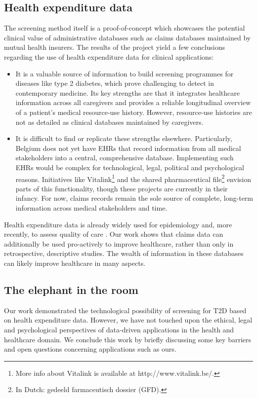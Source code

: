 \subsection{Health expenditure data}
The screening method itself is a proof-of-concept which showcases the potential clinical value of administrative databases such as claims databases maintained by mutual health insurers. The results of the project yield a few conclusions regarding the use of health expenditure data for clinical applications:

\begin{itemize}
\item It is a valuable source of information to build screening programmes for diseases like type 2 diabetes, which prove challenging to detect in contemporary medicine. Its key strengths are that it integrates healthcare information across all caregivers and provides a reliable longitudinal overview of a patient's medical resource-use history. However, resource-use histories are not as detailed as clinical databases maintained by caregivers.
\item It is difficult to find or replicate these strengths elsewhere. Particularly, Belgium does not yet have EHRs that record information from all medical stakeholders into a central, comprehensive database. Implementing such EHRs would be complex for technological, legal, political and psychological reasons. Initiatives like Vitalink\footnote{More info about Vitalink is available at http://www.vitalink.be/.} and the shared pharmaceutical file\footnote{In Dutch: gedeeld farmaceutisch dossier (GFD).} envision parts of this functionality, though these projects are currently in their infancy. For now, claims records remain the sole source of complete, long-term information across medical stakeholders and time.
\end{itemize}

Health expenditure data is already widely used for epidemiology \citep{pladevall2004clinical,lee2006medication,garg2010acute,s23} and, more recently, to assess quality of care \citep{kcequality}. Our work shows that claims data can additionally be used pro-actively to improve healthcare, rather than only in retrospective, descriptive studies. The wealth of information in these databases can likely improve healthcare in many aspects.


\subsection{The elephant in the room}
Our work demonstrated the technological possibility of screening for T2D based on health expenditure data. However, we have not touched upon the ethical, legal and psychological perspectives of data-driven applications in the health and healthcare domain. We conclude this work by briefly discussing some key barriers and open questions concerning applications such as ours.

